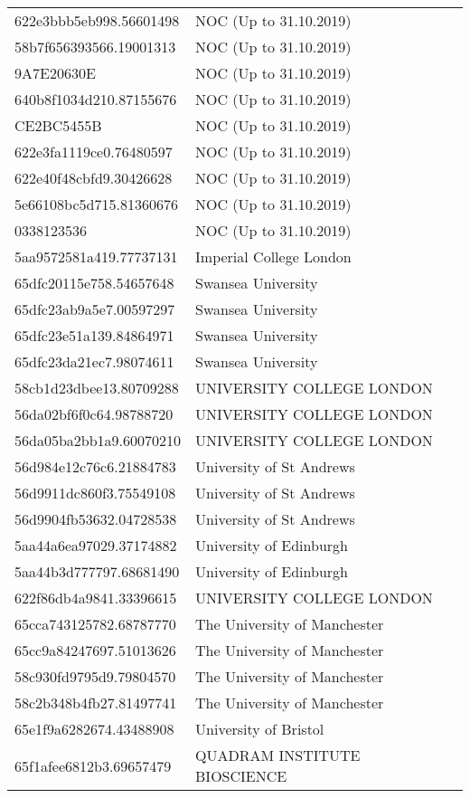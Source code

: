 \begin{tabular}{ll}
622e3bbb5eb998.56601498 & NOC (Up to 31.10.2019) \\
58b7f656393566.19001313 & NOC (Up to 31.10.2019) \\
9A7E20630E & NOC (Up to 31.10.2019) \\
640b8f1034d210.87155676 & NOC (Up to 31.10.2019) \\
CE2BC5455B & NOC (Up to 31.10.2019) \\
622e3fa1119ce0.76480597 & NOC (Up to 31.10.2019) \\
622e40f48cbfd9.30426628 & NOC (Up to 31.10.2019) \\
5e66108bc5d715.81360676 & NOC (Up to 31.10.2019) \\
0338123536 & NOC (Up to 31.10.2019) \\
5aa9572581a419.77737131 & Imperial College London \\
65dfc20115e758.54657648 & Swansea University \\
65dfc23ab9a5e7.00597297 & Swansea University \\
65dfc23e51a139.84864971 & Swansea University \\
65dfc23da21ec7.98074611 & Swansea University \\
58cb1d23dbee13.80709288 & UNIVERSITY COLLEGE LONDON \\
56da02bf6f0c64.98788720 & UNIVERSITY COLLEGE LONDON \\
56da05ba2bb1a9.60070210 & UNIVERSITY COLLEGE LONDON \\
56d984e12c76c6.21884783 & University of St Andrews \\
56d9911dc860f3.75549108 & University of St Andrews \\
56d9904fb53632.04728538 & University of St Andrews \\
5aa44a6ea97029.37174882 & University of Edinburgh \\
5aa44b3d777797.68681490 & University of Edinburgh \\
622f86db4a9841.33396615 & UNIVERSITY COLLEGE LONDON \\
65cca743125782.68787770 & The University of Manchester \\
65cc9a84247697.51013626 & The University of Manchester \\
58c930fd9795d9.79804570 & The University of Manchester \\
58c2b348b4fb27.81497741 & The University of Manchester \\
65e1f9a6282674.43488908 & University of Bristol \\
65f1afee6812b3.69657479 & QUADRAM INSTITUTE BIOSCIENCE \\

\end{tabular}
